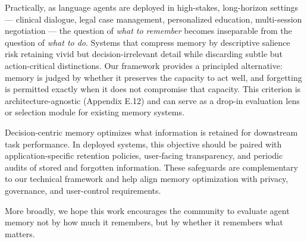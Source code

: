 \documentclass{article}
\theoremstyle{plain}
\theoremstyle{definition}
\theoremstyle{remark}
\begin{document}
Practically, as language agents are deployed in high-stakes, long-horizon settings — clinical dialogue, legal case management, personalized education, multi-session negotiation — the question of \emph{what to remember} becomes inseparable from the question of \emph{what to do}. Systems that compress memory by descriptive salience risk retaining vivid but decision-irrelevant detail while discarding subtle but action-critical distinctions. Our framework provides a principled alternative: memory is judged by whether it preserves the capacity to act well, and forgetting is permitted exactly when it does not compromise that capacity. This criterion is architecture-agnostic (Appendix E.12) and can serve as a drop-in evaluation lens or selection module for existing memory systems.

Decision-centric memory optimizes what information is retained for downstream
task performance. In deployed systems, this objective should be paired with
application-specific retention policies, user-facing transparency, and periodic
audits of stored and forgotten information. These safeguards are complementary
to our technical framework and help align memory optimization with privacy,
governance, and user-control requirements.

More broadly, we hope this work encourages the community to evaluate agent memory not by how much it remembers, but by whether it remembers what matters.







% 
\end{document}
